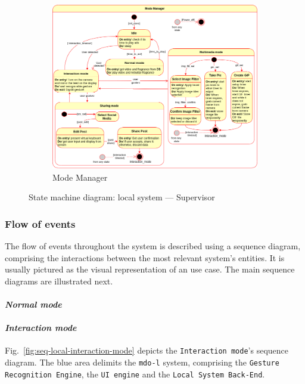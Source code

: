 \begin{figure}[htb!]
%
%
  \begin{subfigure}{.9\textwidth}
  \includegraphics[width=\textwidth]{img/state-mach-local-superv-mode.png}%
  \caption{Mode Manager}%
  \label{fig:state-mach-local-superv-mode}
\end{subfigure}
  \caption{State machine diagram: local system --- Supervisor}%
  \label{fig:state-mach-local-superv}
\end{figure}
%
%
\subsubsection{Flow of events}%
\label{sec:flow-events}
The flow of events throughout the system is described using a sequence diagram,
comprising the interactions between the most relevant system's entities. It is
usually pictured as the visual representation of an use case. The main sequence
diagrams are illustrated next.

\paragraph{\emph{Normal mode}}
\paragraph{\emph{Interaction mode}}
Fig.~\ref{fig:seq-local-interaction-mode} depicts the \texttt{Interaction
  mode}'s sequence diagram. The blue area delimits the \texttt{\gls{mdo-l}}
system, comprising the \texttt{Gesture Recognition Engine}, the \texttt{UI
  engine} and the \texttt{Local System Back-End}.

